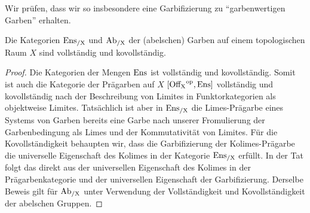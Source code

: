 Wir prüfen, dass wir so insbesondere eine Garbifizierung zu
``garbenwertigen Garben'' erhalten.
\begin{lemma}
  Die Kategorien $\operatorname{Ens_{/X}}$ und $\operatorname{Ab_{/X}}$ der (abelschen) Garben auf einem
  topologischen Raum $X$ sind vollständig und kovollständig.
\end{lemma}
\begin{proof}
  Die Kategorien der Mengen $\operatorname{Ens}$ ist vollständig und
  kovollständig. Somit ist auch die Kategorie der Prägarben auf $X$
  $[\operatorname{Off_X}^\mathrm{op}, \operatorname{Ens}]$ vollständig und kovollständig nach der
  Beschreibung von Limites in Funktorkategorien als objektweise
  Limites. Tatsächlich ist aber in $\operatorname{Ens_{/X}}$ die Limes-Prägarbe eines
  Systems von Garben bereits eine Garbe nach unserer Fromulierung der
  Garbenbedingung als Limes und der Kommutativität von Limites. Für
  die Kovollständigkeit behaupten wir, dass die Garbifizierung der
  Kolimes-Prägarbe die universelle Eigenschaft des Kolimes in der
  Kategorie $\operatorname{Ens_{/X}}$ erfüllt. In der Tat folgt das direkt aus der
  universellen Eigenschaft des Kolimes in der Prägarbenkategorie und
  der universellen Eigenschaft der Garbifizierung.  Derselbe Beweis
  gilt für $\operatorname{Ab_{/X}}$ unter Verwendung der Vollständigkeit und
  Kovollständigkeit der abelschen Gruppen.
\end{proof}

